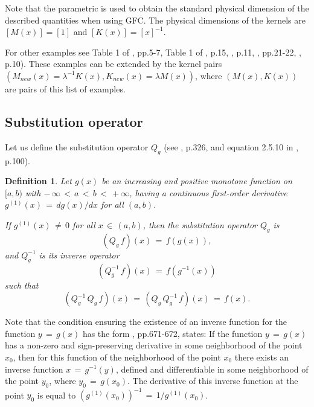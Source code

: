 \documentclass[12pt]{article}
\newtheorem{Definition}{Definition}
\begin{document}
Note that the parametric is used to obtain the standard physical dimension of the described quantities when using GFC.
The physical dimensions of the kernels are $[M(x)]=[1]$ and $[K(x)]=[x]^{-1}$.

For other examples see Table 1 of \cite{GNCM2022}, pp.5-7, Table 1 of \cite{AP2022}, p.15, \cite{PA2023}, p.11,
\cite{Math-Multi2023}, pp.21-22, \cite{Entropy2023-Prob}, p.10). 
These examples can be extended by the kernel pairs 
$(M_{new}(x)= \lambda^{-1} K(x), K_{new}(x)=\lambda M(x))$, 
where $(M(x), K(x))$ are pairs of this list of examples.



\subsection{Substitution operator}

Let us define the substitution operator $Q_g$
(see \cite{SKM}, p.326, and equation 2.5.10 in \cite{KST}, p.100). 

\begin{Definition}
Let $g(x)$ be an increasing and positive monotone function on $[a, b)$ 
with $ - \, \infty \, < \, a \, < \, b \, < \, +\infty$, 
having a continuous first-order derivative $g^{(1)}(x) \, = \, dg(x)/dx$ for all $(a,b)$.

If $g^{(1)}(x) \, \ne \, 0$ for all $x \, \in \, (a,b)$,
then the substitution operator $Q_g$ is 
\begin{equation}
(Q_g \, f)(x) \, = \, f(g(x)) ,
\end{equation}
and $Q^{-1}_{g}$ is its inverse operator
\begin{equation}
(Q^{-1}_g \, f)(x) \, = \, f(g^{-1}(x)) 
\end{equation}
such that
\begin{equation}
( Q^{-1}_g \, Q_g \, f)(x) \, = \,
(Q_g \,Q^{-1}_g \, f)(x) \, = \, f(x) .
\end{equation}
\end{Definition}


Note that the condition ensuring the existence of an inverse function for the function 
$y \, = \, g(x)$ has the form \cite{ISS1979}, pp.671-672, states:
If the function $y \, = \, g(x)$ has a non-zero and sign-preserving derivative in some neighborhood of the point
$x_0$, then for this function of the neighborhood of the point $x_0$ there exists an inverse function $x \, = \, g^{-1}(y)$,
defined and differentiable in some neighborhood of the point $y_0$, where $y_0 \, = \, g(x_0)$.
The derivative of this inverse function at the point $y_0$ is equal to $(g^{(1)}(x_0))^{-1} \, = \, 1/ g^{(1)}(x_0)$.
\end{document}
